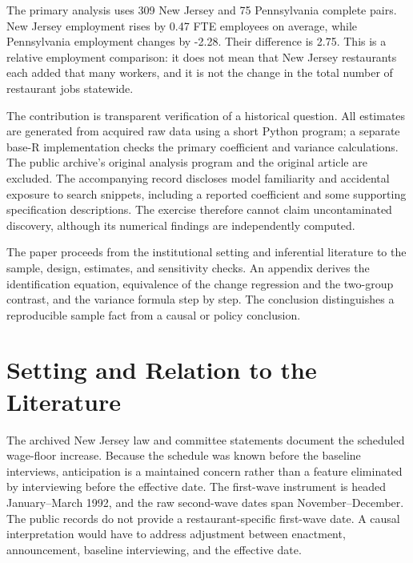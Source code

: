 \documentclass[11pt]{article}
\newcommand{\result}[2]{#2}
\begin{document}
The primary analysis uses \result{primary.n_nj}{309} New Jersey and \result{primary.n_pa}{75} Pennsylvania complete pairs. New Jersey employment rises by \result{nj.change}{0.47} FTE employees on average, while Pennsylvania employment changes by \result{pa.change}{-2.28}. Their difference is \result{primary.estimate}{2.75}. This is a relative employment comparison: it does not mean that New Jersey restaurants each added that many workers, and it is not the change in the total number of restaurant jobs statewide. %

The contribution is transparent verification of a historical question. All estimates are generated from acquired raw data using a short Python program; a separate base-R implementation checks the primary coefficient and variance calculations. The public archive's original analysis program and the original article are excluded. The accompanying record discloses model familiarity and accidental exposure to search snippets, including a reported coefficient and some supporting specification descriptions. The exercise therefore cannot claim uncontaminated discovery, although its numerical findings are independently computed. %

The paper proceeds from the institutional setting and inferential literature to the sample, design, estimates, and sensitivity checks. An appendix derives the identification equation, equivalence of the change regression and the two-group contrast, and the variance formula step by step. The conclusion distinguishes a reproducible sample fact from a causal or policy conclusion. %

\section{Setting and Relation to the Literature}
The archived New Jersey law and committee statements document the scheduled wage-floor increase. Because the schedule was known before the baseline interviews, anticipation is a maintained concern rather than a feature eliminated by interviewing before the effective date. The first-wave instrument is headed January--March 1992, and the raw second-wave dates span November--December. The public records do not provide a restaurant-specific first-wave date. A causal interpretation would have to address adjustment between enactment, announcement, baseline interviewing, and the effective date. %
\end{document}
